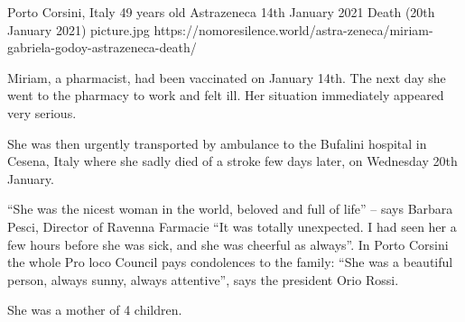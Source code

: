 {Porto Corsini, Italy}
{49 years old}
{Astrazeneca}
{14th January 2021}
{Death (20th January 2021)}
{picture.jpg}
{https://nomoresilence.world/astra-zeneca/miriam-gabriela-godoy-astrazeneca-death/}
{

Miriam, a pharmacist, had been vaccinated on January 14th. The next day she went
to the pharmacy to work and felt ill. Her situation immediately appeared very
serious.

She was then urgently transported by ambulance to the Bufalini hospital in
Cesena, Italy where she sadly died of a stroke few days later, on Wednesday 20th
January.

“She was the nicest woman in the world, beloved and full of life” – says Barbara
Pesci, Director of Ravenna Farmacie “It was totally unexpected. I had seen her a
few hours before she was sick, and she was cheerful as always”. In Porto Corsini
the whole Pro loco Council pays condolences to the family: “She was a beautiful
person, always sunny, always attentive”, says the president Orio Rossi.

She was a mother of 4 children.

}
